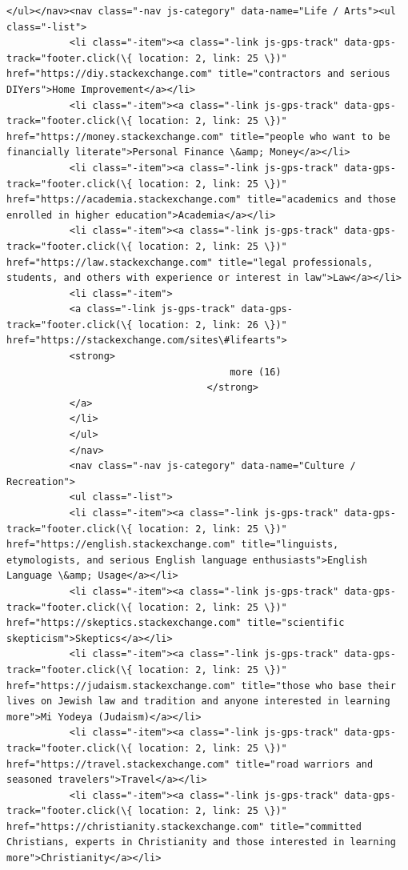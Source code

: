 \documentclass[11pt]{article}
\begin{document}
\begin{Verbatim}[commandchars=\\\{\}]
           </ul></nav><nav class="-nav js-category" data-name="Life / Arts"><ul class="-list">
           <li class="-item"><a class="-link js-gps-track" data-gps-track="footer.click(\{ location: 2, link: 25 \})" href="https://diy.stackexchange.com" title="contractors and serious DIYers">Home Improvement</a></li>
           <li class="-item"><a class="-link js-gps-track" data-gps-track="footer.click(\{ location: 2, link: 25 \})" href="https://money.stackexchange.com" title="people who want to be financially literate">Personal Finance \&amp; Money</a></li>
           <li class="-item"><a class="-link js-gps-track" data-gps-track="footer.click(\{ location: 2, link: 25 \})" href="https://academia.stackexchange.com" title="academics and those enrolled in higher education">Academia</a></li>
           <li class="-item"><a class="-link js-gps-track" data-gps-track="footer.click(\{ location: 2, link: 25 \})" href="https://law.stackexchange.com" title="legal professionals, students, and others with experience or interest in law">Law</a></li>
           <li class="-item">
           <a class="-link js-gps-track" data-gps-track="footer.click(\{ location: 2, link: 26 \})" href="https://stackexchange.com/sites\#lifearts">
           <strong>
                                       more (16)
                                   </strong>
           </a>
           </li>
           </ul>
           </nav>
           <nav class="-nav js-category" data-name="Culture / Recreation">
           <ul class="-list">
           <li class="-item"><a class="-link js-gps-track" data-gps-track="footer.click(\{ location: 2, link: 25 \})" href="https://english.stackexchange.com" title="linguists, etymologists, and serious English language enthusiasts">English Language \&amp; Usage</a></li>
           <li class="-item"><a class="-link js-gps-track" data-gps-track="footer.click(\{ location: 2, link: 25 \})" href="https://skeptics.stackexchange.com" title="scientific skepticism">Skeptics</a></li>
           <li class="-item"><a class="-link js-gps-track" data-gps-track="footer.click(\{ location: 2, link: 25 \})" href="https://judaism.stackexchange.com" title="those who base their lives on Jewish law and tradition and anyone interested in learning more">Mi Yodeya (Judaism)</a></li>
           <li class="-item"><a class="-link js-gps-track" data-gps-track="footer.click(\{ location: 2, link: 25 \})" href="https://travel.stackexchange.com" title="road warriors and seasoned travelers">Travel</a></li>
           <li class="-item"><a class="-link js-gps-track" data-gps-track="footer.click(\{ location: 2, link: 25 \})" href="https://christianity.stackexchange.com" title="committed Christians, experts in Christianity and those interested in learning more">Christianity</a></li>

\end{Verbatim}
\end{document}
